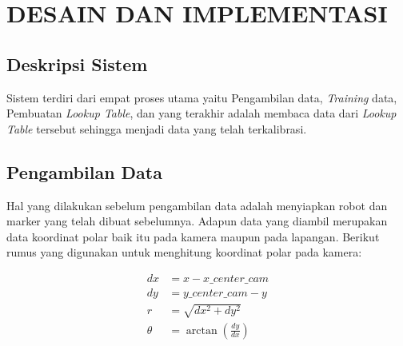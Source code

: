 \chapter{DESAIN DAN IMPLEMENTASI}
\label{chap:desainimplementasi}

\section{Deskripsi Sistem}
\label{sec:deskripsisistem}

Sistem terdiri dari empat proses utama yaitu Pengambilan data, \textit{Training} data, Pembuatan \textit{Lookup Table}, dan yang terakhir adalah membaca data dari \textit{Lookup Table} tersebut sehingga menjadi data yang telah terkalibrasi.

\section{Pengambilan Data
  \label{sec:pengambilandata}}

Hal yang dilakukan sebelum pengambilan data adalah menyiapkan robot dan marker yang telah dibuat sebelumnya. Adapun data yang diambil merupakan data koordinat polar baik itu pada kamera maupun pada lapangan. Berikut rumus yang digunakan untuk menghitung koordinat polar pada kamera: 

\begin{equation}
  \begin{aligned}
    dx &= x - x\_center\_cam \\ 
    dy &= y\_center\_cam - y \\
    r &= \sqrt{dx^2 + dy^2} \\
    \theta &= \arctan(\frac{dy}{dx})
  \end{aligned}
\end{equation}

